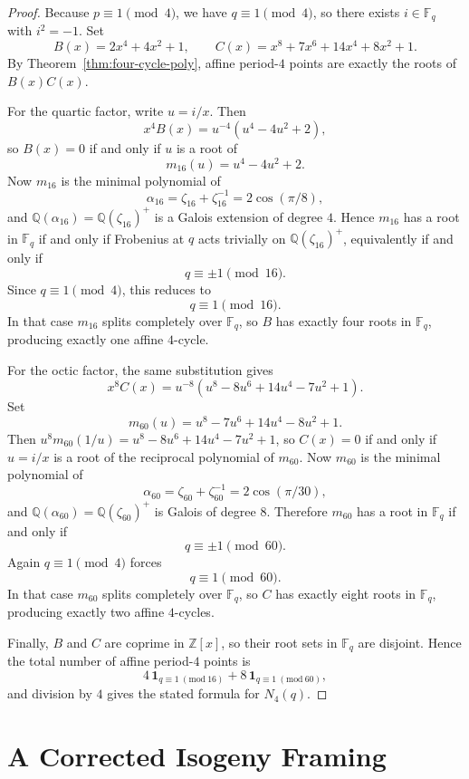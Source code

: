 \documentclass[11pt]{article}
\newcommand{\F}{\mathbb{F}}
\begin{document}
\begin{proof}
Because $p\equiv 1\pmod4$, we have $q\equiv 1\pmod4$, so there exists $i\in\F_q$ with $i^2=-1$.
Set
\[
B(x)=2x^4+4x^2+1,
\qquad
C(x)=x^8+7x^6+14x^4+8x^2+1.
\]
By Theorem~\ref{thm:four-cycle-poly}, affine period-$4$ points are exactly the roots of $B(x)C(x)$.

For the quartic factor, write $u=i/x$.
Then
\[
x^4B(x)=u^{-4}(u^4-4u^2+2),
\]
so $B(x)=0$ if and only if $u$ is a root of
\[
m_{16}(u)=u^4-4u^2+2.
\]
Now $m_{16}$ is the minimal polynomial of
\[
\alpha_{16}=\zeta_{16}+\zeta_{16}^{-1}=2\cos(\pi/8),
\]
and $\mathbb{Q}(\alpha_{16})=\mathbb{Q}(\zeta_{16})^+$ is a Galois extension of degree $4$.
Hence $m_{16}$ has a root in $\F_q$ if and only if Frobenius at $q$ acts trivially on $\mathbb{Q}(\zeta_{16})^+$, equivalently if and only if
\[
q\equiv \pm 1 \pmod{16}.
\]
Since $q\equiv 1\pmod4$, this reduces to
\[
q\equiv 1\pmod{16}.
\]
In that case $m_{16}$ splits completely over $\F_q$, so $B$ has exactly four roots in $\F_q$, producing exactly one affine $4$-cycle.

For the octic factor, the same substitution gives
\[
x^8C(x)=u^{-8}(u^8-8u^6+14u^4-7u^2+1).
\]
Set
\[
m_{60}(u)=u^8-7u^6+14u^4-8u^2+1.
\]
Then $u^8m_{60}(1/u)=u^8-8u^6+14u^4-7u^2+1$, so $C(x)=0$ if and only if $u=i/x$ is a root of the reciprocal polynomial of $m_{60}$.
Now $m_{60}$ is the minimal polynomial of
\[
\alpha_{60}=\zeta_{60}+\zeta_{60}^{-1}=2\cos(\pi/30),
\]
and $\mathbb{Q}(\alpha_{60})=\mathbb{Q}(\zeta_{60})^+$ is Galois of degree $8$.
Therefore $m_{60}$ has a root in $\F_q$ if and only if
\[
q\equiv \pm 1\pmod{60}.
\]
Again $q\equiv 1\pmod4$ forces
\[
q\equiv 1\pmod{60}.
\]
In that case $m_{60}$ splits completely over $\F_q$, so $C$ has exactly eight roots in $\F_q$, producing exactly two affine $4$-cycles.

Finally, $B$ and $C$ are coprime in $\mathbb{Z}[x]$, so their root sets in $\F_q$ are disjoint.
Hence the total number of affine period-$4$ points is
\[
4\,\mathbf{1}_{q\equiv 1\ (\mathrm{mod}\ 16)}+
8\,\mathbf{1}_{q\equiv 1\ (\mathrm{mod}\ 60)},
\]
and division by $4$ gives the stated formula for $N_4(q)$.
\end{proof}

\section{A Corrected Isogeny Framing}
\end{document}
